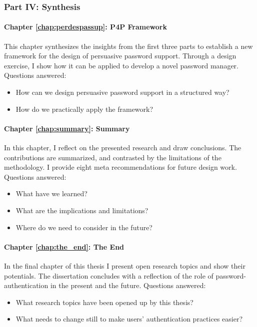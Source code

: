 \subsubsection{Part IV: Synthesis}
\paragraph{Chapter \ref{chap:perdespassup}: P4P Framework} %
This chapter synthesizes the insights from the first three parts to establish a new framework for the design of persuasive password support. Through a design exercise, I show how it can be applied to develop a novel password manager. 
Questions answered: \vspace*{-5pt} \begin{itemize}[leftmargin=*,itemsep=-5pt]
	\item How can we design persuasive password support in a structured way?
	\item How do we practically apply the framework?
\end{itemize}

\paragraph{Chapter \ref{chap:summary}: Summary} %
In this chapter, I reflect on the presented research and draw conclusions. The contributions are summarized, and contrasted by the limitations of the methodology. I provide eight meta recommendations for future design work. 
Questions answered: \vspace*{-5pt} \begin{itemize}[leftmargin=*,itemsep=-5pt]
	\item What have we learned?
	\item What are the implications and limitations?
	\item Where do we need to consider in the future?
\end{itemize}

\paragraph{Chapter \ref{chap:the_end}: The End} %
In the final chapter of this thesis I present open research topics and show their potentials. The dissertation concludes with a reflection of the role of password-authentication in the present and the future. 
Questions answered: \vspace*{-5pt} \begin{itemize}[leftmargin=*,itemsep=-5pt]
	\item What research topics have been opened up by this thesis?
	\item What needs to change still to make users' authentication practices easier?
\end{itemize}
